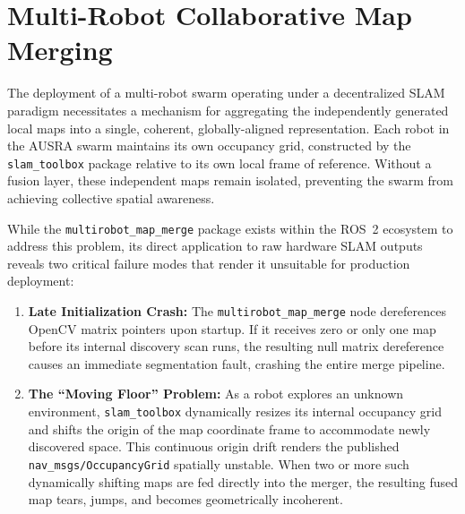 \documentclass{article}
\begin{document}
\renewcommand{\thesection}{X}


\section{Multi-Robot Collaborative Map Merging}
\label{sec:map_merge}

The deployment of a multi-robot swarm operating under a decentralized SLAM paradigm necessitates a mechanism for aggregating the independently generated local maps into a single, coherent, globally-aligned representation. Each robot in the AUSRA swarm maintains its own occupancy grid, constructed by the \texttt{slam\_toolbox} package relative to its own local frame of reference. Without a fusion layer, these independent maps remain isolated, preventing the swarm from achieving collective spatial awareness.

While the \texttt{multirobot\_map\_merge} package exists within the ROS~2 ecosystem to address this problem, its direct application to raw hardware SLAM outputs reveals two critical failure modes that render it unsuitable for production deployment:

\begin{enumerate}
    \item \textbf{Late Initialization Crash:} The \texttt{multirobot\_map\_merge} node dereferences OpenCV matrix pointers upon startup. If it receives zero or only one map before its internal discovery scan runs, the resulting null matrix dereference causes an immediate segmentation fault, crashing the entire merge pipeline.

    \item \textbf{The ``Moving Floor'' Problem:} As a robot explores an unknown environment, \texttt{slam\_toolbox} dynamically resizes its internal occupancy grid and shifts the origin of the map coordinate frame to accommodate newly discovered space. This continuous origin drift renders the published \texttt{nav\_msgs/OccupancyGrid} spatially unstable. When two or more such dynamically shifting maps are fed directly into the merger, the resulting fused map tears, jumps, and becomes geometrically incoherent.
\end{enumerate}
\end{document}
